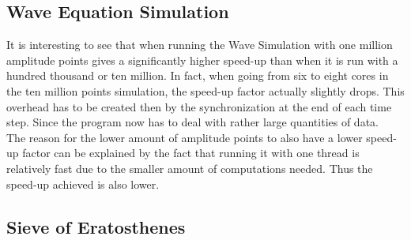\documentclass[a4paper,12px]{article}
\begin{document}
\subsection{Wave Equation Simulation}
It is interesting to see that when running the Wave Simulation with one million
amplitude points gives a significantly higher speed-up than when it is run with
a hundred thousand or ten million. In fact, when going from six to eight cores
in the ten million points simulation, the speed-up factor actually slightly
drops. This overhead has to be created then by the synchronization at the end of
each time step. Since the program now has to deal with rather large quantities
of data.\\
The reason for the lower amount of amplitude points to also have a lower
speed-up factor can be explained by the fact that running it with one thread is
relatively fast due to the smaller amount of computations needed. Thus the
speed-up achieved is also lower.


\subsection{Sieve of Eratosthenes}





%
%
\end{document}
